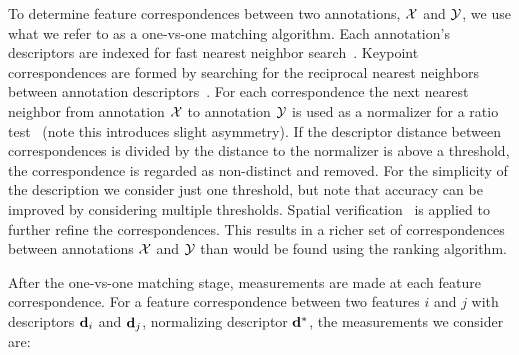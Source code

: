 To determine feature correspondences between two annotations, $\mathcal{X}$ and $\mathcal{Y}$, we use what we refer to as a
  one-vs-one matching algorithm.
Each annotation's descriptors are indexed for fast nearest neighbor search~\cite{muja_fast_2009}.
Keypoint correspondences are formed by searching for the reciprocal nearest neighbors between annotation
  descriptors~\cite{qin_hello_2011}.
For each correspondence the next nearest neighbor from annotation $\mathcal{X}$ to annotation $\mathcal{Y}$ is used as a
  normalizer for a ratio test~\cite{lowe_distinctive_2004} (note this introduces slight asymmetry).
If the descriptor distance between correspondences is divided by the distance to the normalizer is above a
  threshold, the correspondence is regarded as non-distinct and removed.
For the simplicity of the description we consider just one threshold, but note that accuracy can be improved by
  considering multiple thresholds.
Spatial verification~\cite{philbin_object_2007} is applied to further refine the correspondences.
This results in a richer set of correspondences between annotations $\mathcal{X}$ and $\mathcal{Y}$ than would be found using
  the ranking algorithm.

After the one-vs-one matching stage, measurements are made at each feature correspondence.
For a feature correspondence between two features $i$ and $j$ with descriptors $\mathbf{d}_i$ and $\mathbf{d}_j$,
  normalizing descriptor $\mathbf{d}^{*}$, the measurements we consider are:

